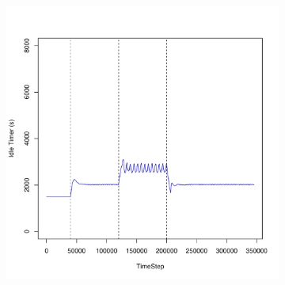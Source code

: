 \documentclass[a4j]{ujarticle}
\begin{document}
\clearpage

\begin{figure}[htbp]
 \centering
 \begin{subfigure}{0.49\hsize}
   \centering
   \includegraphics[width=1.0\hsize]{scenario_7_idleTimer_0_691200_1-35_0-000203_0_0_addIn6000s_random.pdf}
   \label{subfig:scenario_7_idleTimer_0_691200_1-35_0-000203_0_0_addIn6000s_random}
 \end{subfigure}
 \par\bigskip %
 \begin{subfigure}{0.49\hsize}
   \centering

\end{subfigure}
\end{figure}
\end{document}
